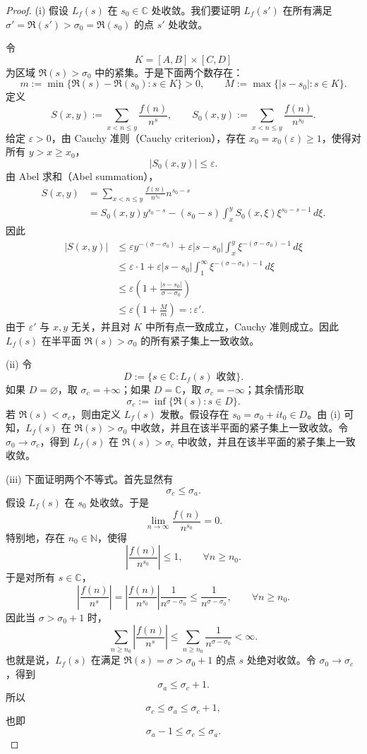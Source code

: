 \begin{proof}
	(i) 假设 $L_f(s)$ 在 $s_0\in\mathbb C$ 处收敛。我们要证明 $L_f(s')$ 在所有满足 $\sigma'=\Re(s')>\sigma_0=\Re(s_0)$ 的点 $s'$ 处收敛。

	令
	\[
		K=[A,B]\times[C,D]
	\]
	为区域 $\Re(s)>\sigma_0$ 中的紧集。于是下面两个数存在：
	\[
		m:=\min\{\Re(s)-\Re(s_0):s\in K\}>0,
		\qquad
		M:=\max\{|s-s_0|:s\in K\}.
	\]
	定义
	\[
		S(x,y):=\sum_{x<n\leq y}\frac{f(n)}{n^s},
		\qquad
		S_0(x,y):=\sum_{x<n\leq y}\frac{f(n)}{n^{s_0}}.
	\]
	给定 $\varepsilon>0$，由 Cauchy 准则（Cauchy criterion），存在 $x_0=x_0(\varepsilon)\geq 1$，使得对所有 $y>x\geq x_0$，
	\[
		|S_0(x,y)|\leq \varepsilon.
	\]
	由 Abel 求和（Abel summation），
	\[
	\begin{aligned}
		S(x,y)
		&=
		\sum_{x<n\leq y}\frac{f(n)}{n^{s_0}}n^{s_0-s}\\
		&=
		S_0(x,y)y^{s_0-s}
		-
		(s_0-s)\int_x^y S_0(x,\xi)\xi^{s_0-s-1}\,d\xi.
	\end{aligned}
	\]
	因此
	\[
	\begin{aligned}
		|S(x,y)|
		&\leq
		\varepsilon y^{-(\sigma-\sigma_0)}
		+
		\varepsilon |s-s_0|\int_x^y \xi^{-(\sigma-\sigma_0)-1}\,d\xi\\
		&\leq
		\varepsilon\cdot 1
		+
		\varepsilon |s-s_0|\int_1^\infty \xi^{-(\sigma-\sigma_0)-1}\,d\xi\\
		&\leq
		\varepsilon\left(1+\frac{|s-s_0|}{\sigma-\sigma_0}\right)\\
		&\leq
		\varepsilon\left(1+\frac{M}{m}\right)
		=:\varepsilon'.
	\end{aligned}
	\]
	由于 $\varepsilon'$ 与 $x,y$ 无关，并且对 $K$ 中所有点一致成立，Cauchy 准则成立。因此 $L_f(s)$ 在半平面 $\Re(s)>\sigma_0$ 的所有紧子集上一致收敛。

	(ii) 令
	\[
		D:=\{s\in\mathbb C:L_f(s)\text{ 收敛}\}.
	\]
	如果 $D=\varnothing$，取 $\sigma_c=+\infty$；如果 $D=\mathbb C$，取 $\sigma_c=-\infty$；其余情形取
	\[
		\sigma_c:=\inf\{\Re(s):s\in D\}.
	\]
	若 $\Re(s)<\sigma_c$，则由定义 $L_f(s)$ 发散。假设存在 $s_0=\sigma_0+it_0\in D$。由 (i) 可知，$L_f(s)$ 在 $\Re(s)>\sigma_0$ 中收敛，并且在该半平面的紧子集上一致收敛。令 $\sigma_0\to\sigma_c$，得到 $L_f(s)$ 在 $\Re(s)>\sigma_c$ 中收敛，并且在该半平面的紧子集上一致收敛。

	(iii) 下面证明两个不等式。首先显然有
	\[
		\sigma_c\leq\sigma_a.
	\]
	假设 $L_f(s)$ 在 $s_0$ 处收敛。于是
	\[
		\lim_{n\to\infty}\frac{f(n)}{n^{s_0}}=0.
	\]
	特别地，存在 $n_0\in\mathbb N$，使得
	\[
		\left|\frac{f(n)}{n^{s_0}}\right|\leq 1,
		\qquad \forall n\geq n_0.
	\]
	于是对所有 $s\in\mathbb C$，
	\[
		\left|\frac{f(n)}{n^s}\right|
		=
		\left|\frac{f(n)}{n^{s_0}}\right|
		\frac1{n^{\sigma-\sigma_0}}
		\leq
		\frac1{n^{\sigma-\sigma_0}},
		\qquad \forall n\geq n_0.
	\]
	因此当 $\sigma>\sigma_0+1$ 时，
	\[
		\sum_{n\geq n_0}\left|\frac{f(n)}{n^s}\right|
		\leq
		\sum_{n\geq n_0}\frac1{n^{\sigma-\sigma_0}}
		<\infty.
	\]
	也就是说，$L_f(s)$ 在满足 $\Re(s)=\sigma>\sigma_0+1$ 的点 $s$ 处绝对收敛。令 $\sigma_0\to\sigma_c$，得到
	\[
		\sigma_a\leq\sigma_c+1.
	\]
	所以
	\[
		\sigma_c\leq\sigma_a\leq\sigma_c+1,
	\]
	也即
	\[
		\sigma_a-1\leq\sigma_c\leq\sigma_a.
	\]
\end{proof}

